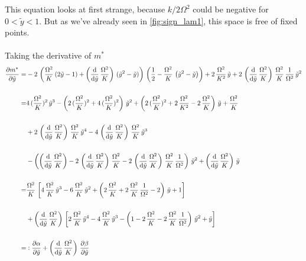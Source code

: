 \documentclass{article}
\begin{document}
This equation looks at first strange, because $k/2\Omega^2$ could be negative for $0<\tilde{y}<1$. But as we've already seen in \autoref{fig:sign_lam1}, this space is free of fixed points. \\\\
Taking the derivative of $m^*$
\begin{align*}
    \frac{\partial m^*}{\partial\tilde{y}}=&-2\,\left(\frac{\Omega^2}{K}\,(2\tilde{y}-1)+\left(\frac{\text{d}}{\text{d}\tilde{y}}\,\frac{\Omega^2}{K}\right)\,(\tilde{y}^2-\tilde{y})\right)\,\left( \frac{1}{2}-\frac{\Omega^2}{K}\,\left( \tilde{y}^2- \tilde{y} \right) \right)+2\,\frac{\Omega^2}{K^2}\,\tilde{y}+2\,\left(\frac{\text{d}}{\text{d}\tilde{y}}\,\frac{\Omega^2}{K}\right)\,\frac{\Omega^2}{K}\,\frac{1}{\Omega^2}\,\tilde{y}^2\\\\
    =&4\,(\frac{\Omega^2}{K})^2\,\tilde{y}^3-\left(2\,(\frac{\Omega^2}{K})^2+4\,(\frac{\Omega^2}{K})^2\right)\,\tilde{y}^2+\left( 2\,(\frac{\Omega^2}{K})^2+2\,\frac{\Omega^2}{K^2}-2\,\frac{\Omega^2}{K} \right)\,\tilde{y}+\frac{\Omega^2}{K}\\\\
    &+2\,\left(\frac{\text{d}}{\text{d}\tilde{y}}\,\frac{\Omega^2}{K}\right)\,\frac{\Omega^2}{K}\,\tilde{y}^4-4\,\left(\frac{\text{d}}{\text{d}\tilde{y}}\,\frac{\Omega^2}{K}\right)\,\frac{\Omega^2}{K}\,\tilde{y}^3\\\\
    &-\left(\left(\frac{\text{d}}{\text{d}\tilde{y}}\,\frac{\Omega^2}{K}\right)-2\,\left(\frac{\text{d}}{\text{d}\tilde{y}}\,\frac{\Omega^2}{K}\right)\,\frac{\Omega^2}{K}-2\,\left(\frac{\text{d}}{\text{d}\tilde{y}}\,\frac{\Omega^2}{K}\right)\,\frac{\Omega^2}{K}\,\frac{1}{\Omega^2}\right)\,\tilde{y}^2+\left(\frac{\text{d}}{\text{d}\tilde{y}}\,\frac{\Omega^2}{K}\right)\,\tilde{y}\\\\
    =&\frac{\Omega^2}{K}\,\left[  4\,\frac{\Omega^2}{K}\,\tilde{y}^3-6\,\frac{\Omega^2}{K}\,\tilde{y}^2+\left( 2\,\frac{\Omega^2}{K}+2\,\frac{\Omega^2}{K}\,\frac{1}{\Omega^2}-2 \right)\,\tilde{y}+1 \right]\\\\
    &+\left(\frac{\text{d}}{\text{d}\tilde{y}}\,\frac{\Omega^2}{K}\right)\,\left[2\,\frac{\Omega^2}{K}\,\tilde{y}^4-4\,\frac{\Omega^2}{K}\,\tilde{y}^3-\left(1-2\,\frac{\Omega^2}{K}-2\,\frac{\Omega^2}{K}\,\frac{1}{\Omega^2}\right)\,\tilde{y}^2+\tilde{y}\right]\\\\
    =&\vcentcolon \frac{\partial \alpha}{\partial\tilde{y}}+\left(\frac{\text{d}}{\text{d}\tilde{y}}\,\frac{\Omega^2}{K}\right)\,\frac{\partial \beta}{\partial\tilde{y}}
\end{align*}
\end{document}
